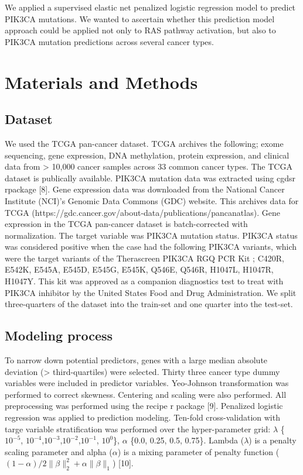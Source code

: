 \documentclass[10pt,letterpaper]{article}
\begin{document}
We applied a supervised elastic net penalized logistic regression model
to predict PIK3CA mutations. We wanted to ascertain whether this
prediction model approach could be applied not only to RAS pathway
activation, but also to PIK3CA mutation predictions across several
cancer types.

\hypertarget{materials-and-methods}{%
\section{Materials and Methods}\label{materials-and-methods}}

\hypertarget{dataset}{%
\subsection{Dataset}\label{dataset}}

We used the TCGA pan-cancer dataset. TCGA archives the following; exome
sequencing, gene expression, DNA methylation, protein expression, and
clinical data from \textgreater{} 10,000 cancer samples across 33 common
cancer types. The TCGA dataset is publically available. PIK3CA mutation
data was extracted using cgdsr rpackage {[}8{]}. Gene expression data
was downloaded from the National Cancer Institute (NCI)'s Genomic Data
Commons (GDC) website. This archives data for TCGA
(https://gdc.cancer.gov/about-data/publications/pancanatlas). Gene
expression in the TCGA pan-cancer dataset is batch-corrected with
normalization. The target variable was PIK3CA mutation status. PIK3CA
status was considered positive when the case had the following PIK3CA
variants, which were the target variants of the Therascreen PIK3CA RGQ
PCR Kit ; C420R, E542K, E545A, E545D, E545G, E545K, Q546E, Q546R,
H1047L, H1047R, H1047Y. This kit was approved as a companion diagnostics
test to treat with PIK3CA inhibitor by the United States Food and Drug
Administration. We split three-quarters of the dataset into the
train-set and one quarter into the test-set.

\hypertarget{modeling-process}{%
\subsection{Modeling process}\label{modeling-process}}

To narrow down potential predictors, genes with a large median absolute
deviation (\textgreater{} third-quartiles) were selected. Thirty three
cancer type dummy variables were included in predictor variables.
Yeo-Johnson transformation was performed to correct skewness. Centering
and scaling were also performed. All preprocessing was performed using
the recipe r package {[}9{]}. Penalized logistic regression was applied
to prediction modeling. Ten-fold cross-validation with targe variable
stratification was performed over the hyper-parameter grid: \(\lambda\)
\{\(10^{-5}\), \(10^{-4}\),\(10^{-3}\),\(10^{-2}\),\(10^{-1}\),
\(10^{0}\)\}, \(\alpha\) \{0.0, 0.25, 0.5, 0.75\}. Lambda (\(\lambda\))
is a penalty scaling parameter and alpha (\(\alpha\)) is a mixing
parameter of penalty function
(\((1-\alpha)/2 \lVert\beta\rVert_2^2+\alpha\lVert \beta \rVert_1\))
{[}10{]}.
\end{document}
